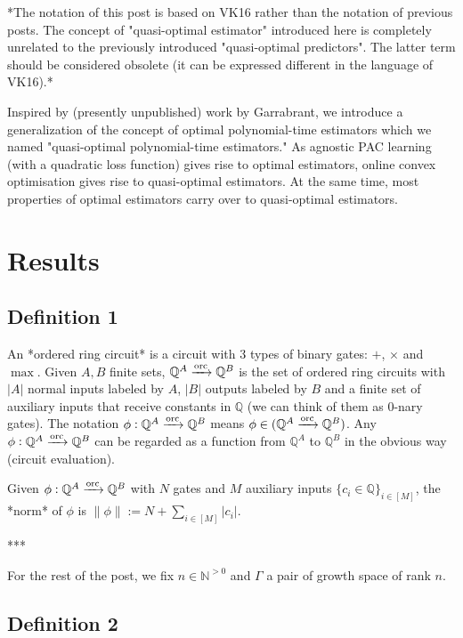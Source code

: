 \documentclass[a4paper]{article}
\newcommand{\Nats}{\mathbb{N}}
\newcommand{\Rats}{\mathbb{Q}}
\newcommand{\Abs}[1]{\lvert #1 \rvert}
\newcommand{\Norm}[1]{\lVert #1 \rVert}
\newcommand{\ORC}{\xrightarrow{\textnormal{orc}}}
\begin{document}
*The notation of this post is based on VK16 rather than the notation of previous posts. The concept of "quasi-optimal estimator" introduced here is completely unrelated to the previously introduced "quasi-optimal predictors". The latter term should be considered obsolete (it can be expressed different in the language of VK16).*

Inspired by (presently unpublished) work by Garrabrant, we introduce a generalization of the concept of optimal polynomial-time estimators which we named "quasi-optimal polynomial-time estimators." As agnostic PAC learning (with a quadratic loss function) gives rise to optimal estimators, online convex optimisation gives rise to quasi-optimal estimators. At the same time, most properties of optimal estimators carry over to quasi-optimal estimators.

\section{Results}

\subsection{Definition 1}

An *ordered ring circuit* is a circuit with 3 types of binary gates: ${+}$, ${\times}$ and ${\max}$. Given ${A,B}$ finite sets, ${\Rats^A \ORC \Rats^B}$ is the set of ordered ring circuits with $\Abs{A}$ normal inputs labeled by ${A}$, ${\Abs{B}}$ outputs labeled by ${B}$ and a finite set of auxiliary inputs that receive constants in ${\Rats}$ (we can think of them as 0-nary gates). The notation ${\phi: \Rats^A \ORC \Rats^B}$ means ${\phi \in (\Rats^A \ORC \Rats^B)}$. Any ${\phi: \Rats^A \ORC \Rats^B}$ can be regarded as a function from ${\Rats^A}$ to ${\Rats^B}$ in the obvious way (circuit evaluation). 

Given ${\phi: \Rats^A \ORC \Rats^B}$ with ${N}$ gates and ${M}$ auxiliary inputs ${\{c_i \in \Rats\}_{i \in [M]}}$, the *norm* of ${\phi}$ is ${\Norm{\phi}:=N+\sum_{i \in [M]} \Abs{c_i}}$.

***

For the rest of the post, we fix ${n \in \Nats^{>0}}$ and ${\Gamma}$ a pair of growth space of rank ${n}$.

\subsection{Definition 2}
\end{document}
